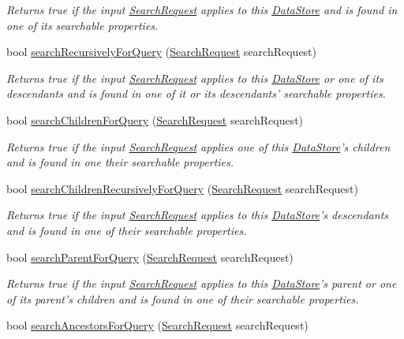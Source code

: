 \begin{DoxyCompactItemize}
\begin{DoxyCompactList}\small\item\em Returns true if the input \hyperlink{struct_search_request}{Search\-Request} applies to this \hyperlink{class_picto_1_1_data_store}{Data\-Store} and is found in one of its searchable properties. \end{DoxyCompactList}\item 
bool \hyperlink{class_picto_1_1_data_store_a8cbdf7d3729fa1b5c914eaa04b45e25a}{search\-Recursively\-For\-Query} (\hyperlink{struct_search_request}{Search\-Request} search\-Request)
\begin{DoxyCompactList}\small\item\em Returns true if the input \hyperlink{struct_search_request}{Search\-Request} applies to this \hyperlink{class_picto_1_1_data_store}{Data\-Store} or one of its descendants and is found in one of it or its descendants' searchable properties. \end{DoxyCompactList}\item 
bool \hyperlink{class_picto_1_1_data_store_afe098cf81ad0ebbc3166b28a5127d8db}{search\-Children\-For\-Query} (\hyperlink{struct_search_request}{Search\-Request} search\-Request)
\begin{DoxyCompactList}\small\item\em Returns true if the input \hyperlink{struct_search_request}{Search\-Request} applies one of this \hyperlink{class_picto_1_1_data_store}{Data\-Store}'s children and is found in one their searchable properties. \end{DoxyCompactList}\item 
bool \hyperlink{class_picto_1_1_data_store_a6e8ea46c4e12abf366805c63723d92c8}{search\-Children\-Recursively\-For\-Query} (\hyperlink{struct_search_request}{Search\-Request} search\-Request)
\begin{DoxyCompactList}\small\item\em Returns true if the input \hyperlink{struct_search_request}{Search\-Request} applies to this \hyperlink{class_picto_1_1_data_store}{Data\-Store}'s descendants and is found in one of their searchable properties. \end{DoxyCompactList}\item 
bool \hyperlink{class_picto_1_1_data_store_a43960803744c2334f74c377d7ed8b62d}{search\-Parent\-For\-Query} (\hyperlink{struct_search_request}{Search\-Request} search\-Request)
\begin{DoxyCompactList}\small\item\em Returns true if the input \hyperlink{struct_search_request}{Search\-Request} applies to this \hyperlink{class_picto_1_1_data_store}{Data\-Store}'s parent or one of its parent's children and is found in one of their searchable properties. \end{DoxyCompactList}\item 
\hypertarget{class_picto_1_1_data_store_ab2378fda64f5296afcf147d4dbdf3792}{bool \hyperlink{class_picto_1_1_data_store_ab2378fda64f5296afcf147d4dbdf3792}{search\-Ancestors\-For\-Query} (\hyperlink{struct_search_request}{Search\-Request} search\-Request)}\label{class_picto_1_1_data_store_ab2378fda64f5296afcf147d4dbdf3792}


\end{DoxyCompactItemize}
